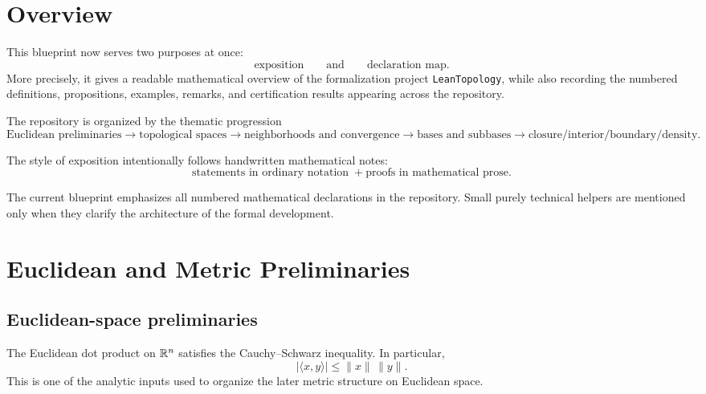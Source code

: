 \tableofcontents

\chapter{Overview}

This blueprint now serves two purposes at once:
\[
\text{exposition} \qquad \text{and} \qquad \text{declaration map}.
\]
More precisely, it gives a readable mathematical overview of the formalization project \texttt{LeanTopology}, while also recording the numbered definitions, propositions, examples, remarks, and certification results appearing across the repository.

The repository is organized by the thematic progression
\[
\text{Euclidean preliminaries}
\longrightarrow
\text{topological spaces}
\longrightarrow
\text{neighborhoods and convergence}
\longrightarrow
\text{bases and subbases}
\longrightarrow
\text{closure/interior/boundary/density}.
\]

The style of exposition intentionally follows handwritten mathematical notes:
\[
\text{statements in ordinary notation}
\;+
\text{proofs in mathematical prose}.
\]

\begin{remark}\label{rem:blueprint-scope}
\leanok
The current blueprint emphasizes all numbered mathematical declarations in the repository. Small purely technical helpers are mentioned only when they clarify the architecture of the formal development.
\end{remark}

\chapter{Euclidean and Metric Preliminaries}

\section{Euclidean-space preliminaries}

\begin{proposition}\label{prop:cs-0-1}
\leanok
The Euclidean dot product on $\mathbb{R}^n$ satisfies the Cauchy--Schwarz inequality.
In particular,
\[
|\langle x,y\rangle| \le \|x\|\,\|y\|.
\]
This is one of the analytic inputs used to organize the later metric structure on Euclidean space.
\end{proposition}

